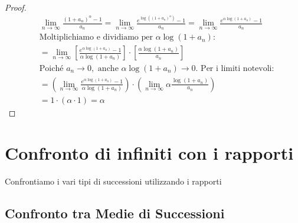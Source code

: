 \begin{proof}
\begin{align*}
& \lim_{ n \to \infty } \frac{(1+a_{n})^\alpha -1}{a_{n}} = \lim_{ n \to \infty } \frac{e^{\log((1+a_n)^\alpha)} - 1}{a_{n}} = \lim_{ n \to \infty } \frac{e^{\alpha \log(1+a_n)} - 1}{a_{n}} \\
& \text{Moltiplichiamo e dividiamo per } \alpha \log(1+a_n): \\ 
& = \lim_{ n \to \infty } \left[ \frac{e^{\alpha \log(1+a_n)} - 1}{\alpha \log(1+a_n)} \right] \cdot \left[ \frac{\alpha \log(1+a_n)}{a_{n}} \right] \\ 
& \text{Poiché } a_n \to 0, \text{ anche } \alpha \log(1+a_n) \to 0. \text{ Per i limiti notevoli:} \\ 
& = \left( \lim_{ n \to \infty } \frac{e^{\alpha \log(1+a_n)} - 1}{\alpha \log(1+a_n)} \right) \cdot \left( \lim_{ n \to \infty } \alpha \frac{\log(1+a_n)}{a_n} \right) \\
& = 1 \cdot (\alpha \cdot 1) = \alpha 
\end{align*}
\end{proof}




\section{Confronto di infiniti con i
rapporti}\label{confronto-di-infiniti-con-i-rapporti}

Confrontiamo i vari tipi di successioni utilizzando i rapporti

\subsection{Confronto tra Medie di
Successioni}\label{confronto-tra-medie-di-successioni}



